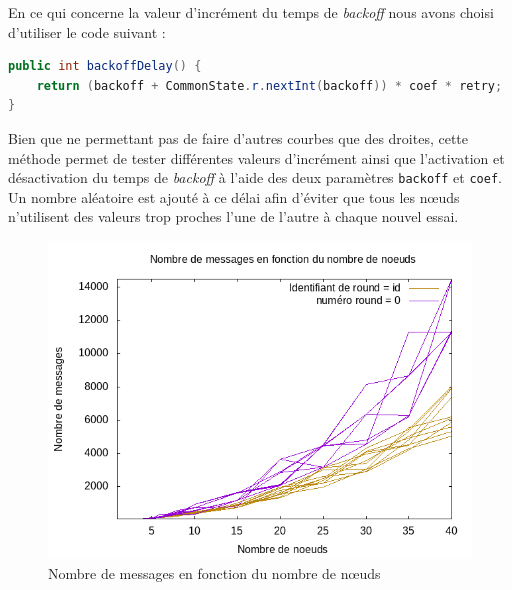 \documentclass[french]{article}
\begin{document}
En ce qui concerne la valeur d'incrément du temps de \emph{backoff} nous avons choisi d'utiliser le code suivant :

\begin{lstlisting}[language=java]
public int backoffDelay() {
	return (backoff + CommonState.r.nextInt(backoff)) * coef * retry;
}
\end{lstlisting}
Bien que ne permettant pas de faire d'autres courbes que des droites, cette méthode permet de tester différentes valeurs d'incrément ainsi que l'activation et désactivation du temps de \emph{backoff} à l'aide des deux paramètres \lstinline{backoff} et \lstinline{coef}.
Un nombre aléatoire est ajouté à ce délai afin d'éviter que tous les nœuds n'utilisent des valeurs trop proches l'une de l'autre à chaque nouvel essai.

\begin{figure}[hb]
    \centering
    \includegraphics[width=1\textwidth]{NoeudsMessages.png} %
    \caption{Nombre de messages en fonction du nombre de nœuds}
    \label{fig:message-node}
\end{figure}
\end{document}
